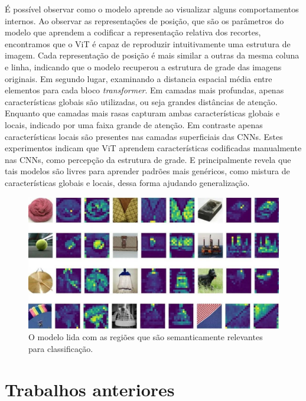 É possível observar como o modelo aprende ao visualizar alguns comportamentos internos. Ao observar as representações de posição, que são os parâmetros do modelo que aprendem a codificar a representação relativa dos recortes, encontramos que o ViT é capaz de reproduzir intuitivamente uma estrutura de imagem. Cada representação de posição é mais similar a outras da mesma coluna e linha, indicando que o modelo recuperou a estrutura de grade das imagens originais. Em segundo lugar, examinando a distancia espacial média entre elementos para cada bloco \textit{transformer}. Em camadas mais profundas, apenas características globais são utilizadas, ou seja grandes distâncias de atenção. Enquanto que camadas mais rasas capturam ambas características globais e locais, indicado por uma faixa grande de atenção. Em contraste apenas características locais são presentes nas camadas superficiais das CNNs. Estes experimentos indicam que ViT aprendem características codificadas manualmente nas CNNs, como percepção da estrutura de grade. E principalmente revela que tais modelos são livres para aprender padrões mais genéricos, como mistura de características globais e locais, dessa forma ajudando generalização.
 

\begin{figure}[!ht]
    \centering
    \includegraphics[width=\columnwidth]{
        Imagens/visualizing-attention-vit.jpg
    }
    \caption{
O modelo lida com as regiões que são semanticamente relevantes para classificação. \cite{ViTvsResNets}
        }
    \label{fig:ViTVisualizationAttention}
\end{figure}



\section{Trabalhos anteriores}\label{sec:Cap2_revisao_literatura}

